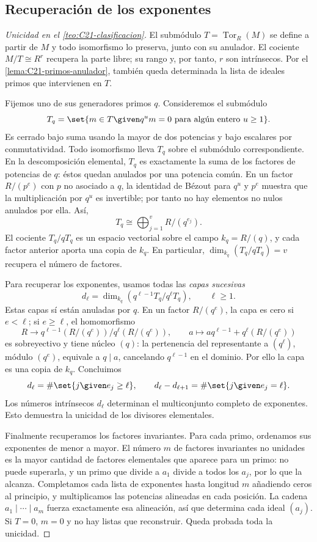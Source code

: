 \subsection{Recuperación de los exponentes}
\begin{proof}[Unicidad en el \cref{teo:C21-clasificacion}]
El submódulo $T=\operatorname{Tor}_R(M)$ se define a partir de $M$ y todo isomorfismo lo preserva, junto con su anulador. El cociente $M/T\cong R^r$ recupera la parte libre; su rango y, por tanto, $r$ son intrínsecos. Por el \cref{lema:C21-primos-anulador}, también queda determinada la lista de ideales primos que intervienen en $T$.

Fijemos uno de sus generadores primos $q$. Consideremos el submódulo
\[
T_q=\set{m\in T\given q^um=0\text{ para algún entero }u\geq1}.
\]
Es cerrado bajo suma usando la mayor de dos potencias y bajo escalares por conmutatividad. Todo isomorfismo lleva $T_q$ sobre el submódulo correspondiente. En la descomposición elemental, $T_q$ es exactamente la suma de los factores de potencias de $q$: éstos quedan anulados por una potencia común. En un factor $R/(p^e)$ con $p$ no asociado a $q$, la identidad de Bézout para $q^u$ y $p^e$ muestra que la multiplicación por $q^u$ es invertible; por tanto no hay elementos no nulos anulados por ella. Así,
\[
T_q\cong\bigoplus_{j=1}^{v}R/(q^{e_j}).
\]
El cociente $T_q/qT_q$ es un espacio vectorial sobre el campo $k_q=R/(q)$, y cada factor anterior aporta una copia de $k_q$. En particular, $\dim_{k_q}(T_q/qT_q)=v$ recupera el número de factores.

Para recuperar los exponentes, usamos todas las \emph{capas sucesivas}
\[
d_\ell=\dim_{k_q}\left(q^{\ell-1}T_q/q^\ell T_q\right),
\qquad \ell\geq1.
\]
Estas capas sí están anuladas por $q$. En un factor $R/(q^e)$, la capa es cero si $e<\ell$; si $e\geq\ell$, el homomorfismo
\[
R\longrightarrow q^{\ell-1}(R/(q^e))/q^\ell(R/(q^e)),
\qquad a\longmapsto aq^{\ell-1}+q^\ell(R/(q^e))
\]
es sobreyectivo y tiene núcleo $(q)$: la pertenencia del representante a $(q^\ell)$, módulo $(q^e)$, equivale a $q\mid a$, cancelando $q^{\ell-1}$ en el dominio. Por ello la capa es una copia de $k_q$. Concluimos
\[
d_\ell=\#\set{j\given e_j\geq\ell},\qquad
d_\ell-d_{\ell+1}=\#\set{j\given e_j=\ell}.
\]
Los números intrínsecos $d_\ell$ determinan el multiconjunto completo de exponentes. Esto demuestra la unicidad de los divisores elementales.

Finalmente recuperamos los factores invariantes. Para cada primo, ordenamos sus exponentes de menor a mayor. El número $m$ de factores invariantes no unidades es la mayor cantidad de factores elementales que aparece para un primo: no puede superarla, y un primo que divide a $a_1$ divide a todos los $a_j$, por lo que la alcanza. Completamos cada lista de exponentes hasta longitud $m$ añadiendo ceros al principio, y multiplicamos las potencias alineadas en cada posición. La cadena $a_1\mid\cdots\mid a_m$ fuerza exactamente esa alineación, así que determina cada ideal $(a_j)$. Si $T=0$, $m=0$ y no hay listas que reconstruir. Queda probada toda la unicidad.
\end{proof}

